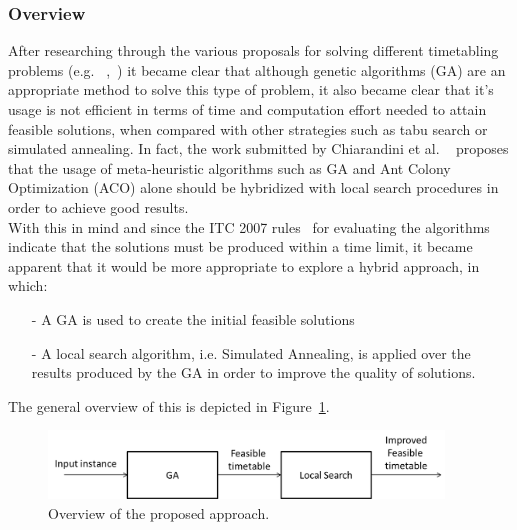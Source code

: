 \subsubsection{Overview}
\label{subsubsec:solution-overview}
After researching through the various proposals for solving different timetabling problems (e.g. ~\cite{Bajeh2001},~\cite{Chiarandini2006}) it became clear that although genetic algorithms (GA) are an appropriate method to solve this type of problem, it also became clear that it’s usage is not efficient in terms of time and computation effort needed to attain feasible solutions, when compared with other strategies such as tabu search or simulated annealing. In fact, the work submitted by Chiarandini et al. ~\cite{Chiarandini2006} proposes that the usage of meta-heuristic algorithms such as GA and Ant Colony Optimization (ACO) alone should be hybridized with local search procedures in order to achieve good results.\\
With this in mind and since the ITC 2007 rules~\cite{McCollum2007} for evaluating the algorithms indicate that the solutions must be produced within a time limit, it became apparent that it would be more appropriate to explore a hybrid approach, in which:
\begin{itemize}
\item[-] A GA is used to create the initial feasible solutions 
\item[-]	A local search algorithm, i.e. Simulated Annealing, is applied over the results produced by the GA in order to improve the quality of solutions.
\end{itemize}
The general overview of this is depicted in Figure~\ref{fig:overviewProposedApproach}.\\
\vspace{0.2cm}
\begin{figure}[h!]
 \centering
   \includegraphics[width=10.5cm]{./images/figures/Fig1_OverviewProposedApproach.png}
   \caption{Overview of the proposed approach.}
   \label{fig:overviewProposedApproach}
\end{figure}\\
